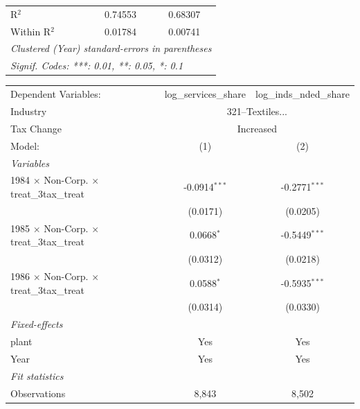 \documentclass[
  12pt]{article}
\theoremstyle{definition}
\theoremstyle{remark}
\begin{document}
\begin{table}
\begin{minipage}{\linewidth}
\begin{tabular}{lcc}
   R$^2$                                                   & 0.74553                & 0.68307\\  
   Within R$^2$                                            & 0.01784                & 0.00741\\  
   \midrule \midrule
   \multicolumn{3}{l}{\emph{Clustered (Year) standard-errors in parentheses}}\\
   \multicolumn{3}{l}{\emph{Signif. Codes: ***: 0.01, **: 0.05, *: 0.1}}\\
\end{tabular}
\par\endgroup
\begingroup
\centering
\begin{tabular}{lcc}
   \tabularnewline \midrule \midrule
   Dependent Variables:                                    & log\_services\_share   & log\_inds\_nded\_share\\     
   Industry & \multicolumn{2}{c}{321–Textiles...} \\ 
   Tax Change & \multicolumn{2}{c}{Increased} \\ 
   Model:                                                  & (1)                    & (2)\\  
   \midrule
   \emph{Variables}\\
   1984 $\times$ Non-Corp. $\times$ treat\_3tax\_treat     & -0.0914$^{***}$        & -0.2771$^{***}$\\   
                                                           & (0.0171)               & (0.0205)\\   
   1985 $\times$ Non-Corp. $\times$ treat\_3tax\_treat     & 0.0668$^{*}$           & -0.5449$^{***}$\\   
                                                           & (0.0312)               & (0.0218)\\   
   1986 $\times$ Non-Corp. $\times$ treat\_3tax\_treat     & 0.0588$^{*}$           & -0.5935$^{***}$\\   
                                                           & (0.0314)               & (0.0330)\\   
   \midrule
   \emph{Fixed-effects}\\
   plant                                                   & Yes                    & Yes\\  
   Year                                                    & Yes                    & Yes\\  
   \midrule
   \emph{Fit statistics}\\
   Observations                                            & 8,843                  & 8,502\\  

\end{tabular}
\end{minipage}
\end{table}
\end{document}
